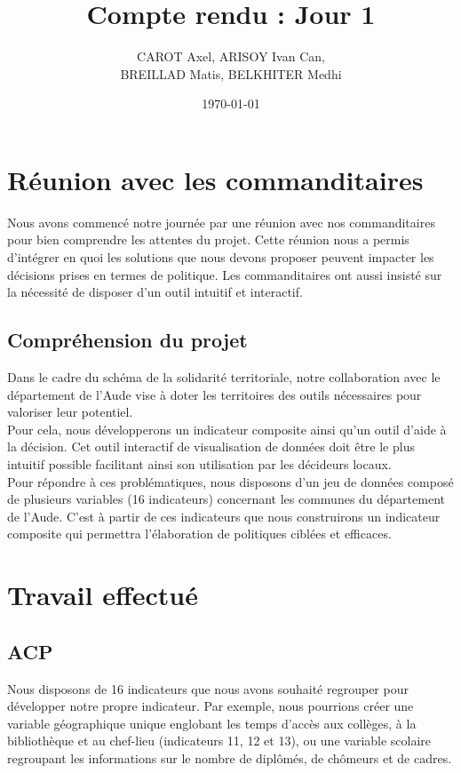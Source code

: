 \documentclass{article}
\title{Compte rendu : Jour 1}
\author{CAROT Axel, ARISOY Ivan Can, \\ BREILLAD Matis, BELKHITER Medhi}
\date{\today}
\begin{document}
\maketitle

\section{Réunion avec les commanditaires}
Nous avons commencé notre journée par une réunion avec nos commanditaires pour bien comprendre les attentes du projet. Cette réunion nous a permis d'intégrer en quoi les solutions que nous devons proposer peuvent impacter les décisions prises en termes de politique. Les commanditaires ont aussi insisté sur la nécessité de disposer d'un outil intuitif et interactif.

\subsection{Compréhension du projet}
Dans le cadre du schéma de la solidarité territoriale, notre collaboration avec le département de l’Aude vise à doter les territoires des outils nécessaires pour valoriser leur potentiel. \\

Pour cela, nous développerons un indicateur composite ainsi qu’un outil d’aide à la décision. Cet outil interactif de visualisation de données doit être le plus intuitif possible facilitant ainsi son utilisation par les décideurs locaux. \\

Pour répondre à ces problématiques, nous disposons d’un jeu de données composé de plusieurs variables (16 indicateurs) concernant les communes du département de l’Aude. C’est à partir de ces indicateurs que nous construirons un indicateur composite qui permettra l'élaboration de politiques ciblées et efficaces.

\section{Travail effectué}

\subsection{ACP}
Nous disposons de 16 indicateurs que nous avons souhaité regrouper pour développer notre propre indicateur. Par exemple, nous pourrions créer une variable géographique unique englobant les temps d'accès aux collèges, à la bibliothèque et au chef-lieu (indicateurs 11, 12 et 13), ou une variable scolaire regroupant les informations sur le nombre de diplômés, de chômeurs et de cadres.\\
\end{document}
